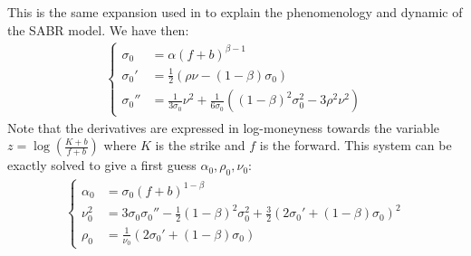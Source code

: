\documentclass[]{rAMF2e}
\begin{document}
This is the same expansion used in \citep[equation (3.1a)]{hagan2002managing} to explain the phenomenology and dynamic of the SABR model. We have then:
\begin{align}
\begin{cases}
\sigma_0 &= \alpha(f+b)^{\beta-1}\\
\sigma_0' &= \frac{1}{2}\left(\rho \nu - (1-\beta)\sigma_0\right)\\
\sigma_0'' &= \frac{1}{3\sigma_0}\nu^2+\frac{1}{6\sigma_0}\left((1-\beta)^2\sigma_0^2 - 3\rho^2\nu^2\right)
\end{cases}
\end{align} 
Note that the derivatives are expressed in log-moneyness towards the variable $z=\log(\frac{K+b}{f+b})$ where $K$ is the strike and $f$ is the forward.
This system can be exactly solved to give a first guess $\alpha_0, \rho_0,\nu_0$:
\begin{align}
  \begin{cases}
\alpha_0 &=  \sigma_0 (f+b)^{1-\beta}\\
\nu_0^2 &= 3\sigma_0\sigma_0''-\frac{1}{2}(1-\beta)^2\sigma_0^2+\frac{3}{2}\left(2\sigma_0'+(1-\beta)\sigma_0\right)^2 \\
\rho_0 &= \frac{1}{\nu_0}\left(2\sigma_0'+(1-\beta)\sigma_0\right) 
\end{cases} 
\end{align}
\end{document}
